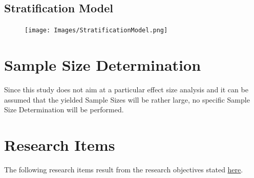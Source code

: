 \documentclass[
  letterpaper,
  DIV=11,
  numbers=noendperiod]{scrreprt}
\begin{document}
\hfill\break

\hypertarget{stratification-model}{%
\subsection{Stratification Model}\label{stratification-model}}

\begin{figure}

{\centering \texttt{[image: Images/StratificationModel.png]}

}

\end{figure}

\hypertarget{sample-size-determination}{%
\section{Sample Size Determination}\label{sample-size-determination}}

Since this study does not aim at a particular effect size analysis and
it can be assumed that the yielded Sample Sizes will be rather large, no
specific Sample Size Determination will be performed.

\hypertarget{section-ResearchItems}{%
\section{Research Items}\label{section-ResearchItems}}

The following research items result from the research objectives stated
\protect\hyperlink{section-ResearchObjectives}{here}.
\end{document}
